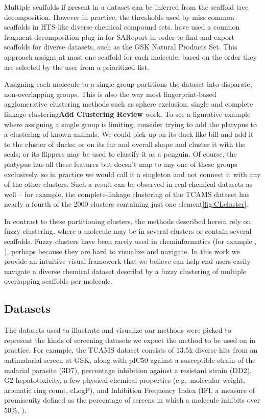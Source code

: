 \documentclass[journal=jacsat,manuscript=article]{achemso}
\newcommand*\eg{e.g.~}
\begin{document}
Multiple scaffolds if present in a dataset can be inferred from the scaffold
tree decomposition\cite{ClarkLabute2008SAReport}. However in practice, the
thresholds used by \citeauthor{ClarkLabute2008SAReport} miss common scaffolds in
HTS-like diverse chemical compound sets. \citeauthor{Bandyopadhyay2011ACS} have
used a common fragment decomposition plug-in for SAReport in order to find and
export scaffolds for diverse datasets, such as the GSK Natural Products Set\cite{Coma2014}.  This approach assigns at most one scaffold for each molecule, based on the order they are selected by the user from a prioritized list.   

Assigning each molecule to a single group partitions the dataset into disparate, non-overlapping groups.  This is also the way most fingerprint-based agglomerative clustering methods such as sphere exclusion, single and complete linkage clustering\textbf{Add Clustering Review} work. To see a figurative example where assigning a single group is limiting, consider trying to add the platypus to a clustering of known animals. We could pick up on its duck-like bill and add it to the cluster of ducks; or on its fur and overall shape and cluster it with the seals; or its flippers may be used to classify it as a penguin. Of course, the platypus has all these features but doesn't map to any one of these groups exclusively, so in practice we would call it a singleton and not connect it with any of the other clusters. Such a result can be observed in real chemical datasets as well -- for example, the complete-linkage clustering of the TCAMS dataset\cite{Gamo2010,Calderon2011} has nearly a fourth of the 2000 clusters containing just one element\ref{fig:CLcluster}.        

In contrast to these partitioning clusters, the methods described herein rely on fuzzy clustering, where a molecule may be in several clusters or contain several scaffolds. Fuzzy clusters have been rarely used in cheminformatics (for example \cite{Holliday2004}, \cite{Richmond2015Galois}), perhaps because they are hard to visualize and navigate.  In this work we provide an intuitive visual framework that we believe can help end users easily navigate a diverse chemical dataset describd by a fuzzy clustering of multiple overlapping scaffolds per molecule.    

\subsection{Datasets}
\label{sec:datasets}
The datasets used to illustrate and visualize our methods were picked to represent the kinds of screening datasets we expect the method to be used on in practice. For example, the TCAMS dataset\cite{Gamo2010} consists of 13.5k diverse hits from an antimalarial screen at GSK, along with pIC50 against a susceptible strain of the malarial parasite (3D7), percentage inhibition against a resistant strain (DD2), G2 hepatotoxicity, a few physical chemical properties (\eg molecular weight, aromatic ring count, cLogP), and Inhibition Frequency Index (IFI, a measure of promiscuity defined as the percentage of screens in which a molecule inhibits over 50\%, \cite{Chakravorty2013IFI}).   
\end{document}
